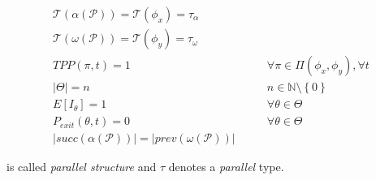\documentclass[12pt,a4paper]{report}
\newcommand{\N}{\mathbb{N}}
\begin{document}
\begin{eqnarray}
	\mathscr{T}(\alpha(\mathcal{P})) = \mathscr{T}(\phi_x) = \tau_{\alpha} \\ \mathscr{T}(\omega(\mathcal{P})) = \mathscr{T}(\phi_y) = \tau_{\omega} \\
	TPP(\pi, t) = 1 & \qquad \forall \pi \in \Pi(\phi_{x}, \phi_{y}), \forall t \\
	|\Theta| = n  & \qquad n \in \N \setminus \left\{0\right\} \\
	E[I_{\theta}] = 1 & \qquad \forall \theta \in \Theta \\
	P_{exit}(\theta, t) = 0 & \qquad \forall \theta \in \Theta \\
	|succ(\alpha(\mathcal{P}))| = |prev(\omega(\mathcal{P}))|
\end{eqnarray}

is called \textit{parallel structure} and $\tau$ denotes a \textit{parallel} type.
\end{document}
